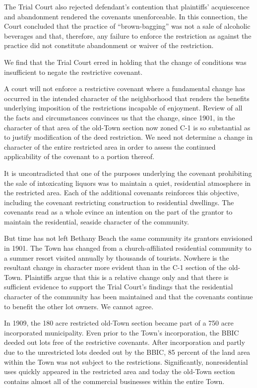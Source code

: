 The Trial Court also rejected defendant's contention that plaintiffs'
acquiescence and abandonment rendered the covenants unenforceable. In this
connection, the Court concluded that the practice of ``brown-bagging'' was not a
sale of alcoholic beverages and that, therefore, any failure to enforce the
restriction as against the practice did not constitute abandonment or waiver of
the restriction.


We find that the Trial Court erred in holding that the change of conditions was
insufficient to negate the restrictive covenant.

A court will not enforce a restrictive covenant where a fundamental change has
occurred in the intended character of the neighborhood that renders the benefits
underlying imposition of the restrictions incapable of enjoyment. Review of all
the facts and circumstances convinces us that the change, since 1901, in the
character of that area of the old-Town section now zoned C-1 is so substantial
as to justify modification of the deed restriction. We need not determine a
change in character of the entire restricted area in order to assess the
continued applicability of the covenant to a portion thereof.

It is uncontradicted that one of the purposes underlying the covenant
prohibiting the sale of intoxicating liquors was to maintain a quiet,
residential atmosphere in the restricted area. Each of the additional covenants
reinforces this objective, including the covenant restricting construction to
residential dwellings. The covenants read as a whole evince an intention on the
part of the grantor to maintain the residential, seaside character of the
community.

But time has not left Bethany Beach the same community its grantors envisioned
in 1901. The Town has changed from a church-affiliated residential community to
a summer resort visited annually by thousands of tourists. Nowhere is the
resultant change in character more evident than in the C-1 section of the
old-Town. Plaintiffs argue that this is a relative change only and that there is
sufficient evidence to support the Trial Court's findings that the residential
character of the community has been maintained and that the covenants continue
to benefit the other lot owners. We cannot agree.

In 1909, the 180 acre restricted old-Town section became part of a 750 acre
incorporated municipality. Even prior to the Town's incorporation, the BBIC
deeded out lots free of the restrictive covenants. After incorporation and
partly due to the unrestricted lots deeded out by the BBIC, 85 percent of the
land area within the Town was not subject to the restrictions. Significantly,
nonresidential uses quickly appeared in the restricted area and today the
old-Town section contains almost all of the commercial businesses within the
entire Town.


